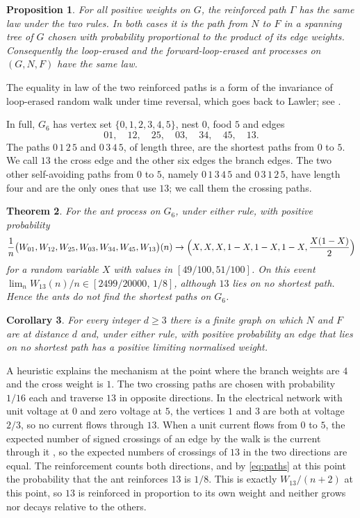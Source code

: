 \documentclass[11pt]{amsart}
\newtheorem{theorem}{Theorem}
\newtheorem{proposition}[theorem]{Proposition}
\newtheorem{corollary}[theorem]{Corollary}
\theoremstyle{remark}
\begin{document}
\begin{proposition}\label{prop:same}
For all positive weights on $G$, the reinforced path $\Gamma$ has the same law under the two rules. In both cases it is the path from $N$ to $F$ in a spanning tree of $G$ chosen with probability proportional to the product of its edge weights. Consequently the loop-erased and the forward-loop-erased ant processes on $(G,N,F)$ have the same law.
\end{proposition}

The equality in law of the two reinforced paths is a form of the invariance of loop-erased random walk under time reversal, which goes back to Lawler; see \cite[Corollary~4.4 and the remark before it]{LP16}.

In full, $G_6$ has vertex set $\{0,1,2,3,4,5\}$, nest $0$, food $5$ and edges
\[
01,\quad 12,\quad 25,\quad 03,\quad 34,\quad 45,\quad 13 .
\]
The paths $0\,1\,2\,5$ and $0\,3\,4\,5$, of length three, are the shortest paths from $0$ to $5$. We call $13$ the cross edge and the other six edges the branch edges. The two other self-avoiding paths from $0$ to $5$, namely $0\,1\,3\,4\,5$ and $0\,3\,1\,2\,5$, have length four and are the only ones that use $13$; we call them the crossing paths.

\begin{theorem}\label{thm:main}
For the ant process on $G_6$, under either rule, with positive probability
\[
\frac1n\bigl(W_{01},W_{12},W_{25},W_{03},W_{34},W_{45},W_{13}\bigr)(n)\to\Bigl(X,X,X,1-X,1-X,1-X,\frac{X(1-X)}2\Bigr)
\]
for a random variable $X$ with values in $[49/100,51/100]$.
On this event $\lim_n W_{13}(n)/n\in[2499/20000,\,1/8]$, although $13$ lies on no shortest path. Hence the ants do not find the shortest paths on $G_6$.
\end{theorem}

\begin{corollary}\label{cor:distance}
For every integer $d\ge3$ there is a finite graph on which $N$ and $F$ are at distance $d$ and, under either rule, with positive probability an edge that lies on no shortest path has a positive limiting normalised weight.
\end{corollary}

A heuristic explains the mechanism at the point where the branch weights are $4$ and the cross weight is $1$. The two crossing paths are chosen with probability $1/16$ each and traverse $13$ in opposite directions. In the electrical network with unit voltage at $0$ and zero voltage at $5$, the vertices $1$ and $3$ are both at voltage $2/3$, so no current flows through $13$. When a unit current flows from $0$ to $5$, the expected number of signed crossings of an edge by the walk is the current through it \cite[Proposition~2.2]{LP16}, so the expected numbers of crossings of $13$ in the two directions are equal. The reinforcement counts both directions, and by \eqref{eq:paths} at this point the probability that the ant reinforces $13$ is $1/8$. This is exactly $W_{13}/(n+2)$ at this point, so $13$ is reinforced in proportion to its own weight and neither grows nor decays relative to the others.
\end{document}
